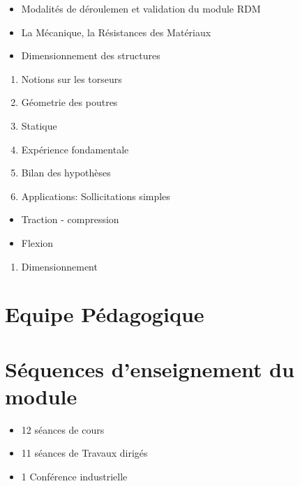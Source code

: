 \documentclass[
]{book}
\providecommand{\tightlist}{%
  \setlength{\itemsep}{0pt}\setlength{\parskip}{0pt}}
\begin{document}
\begin{itemize}
\tightlist
\item
  Modalités de déroulemen et validation du module RDM
\item
  La Mécanique, la Résistances des Matériaux
\item
  Dimensionnement des structures
\end{itemize}

\begin{enumerate}
\def\labelenumi{\arabic{enumi}.}
\tightlist
\item
  Notions sur les torseurs
\item
  Géometrie des poutres
\item
  Statique
\item
  Expérience fondamentale
\item
  Bilan des hypothèses
\item
  Applications: Sollicitations simples
\end{enumerate}

\begin{itemize}
\tightlist
\item
  Traction - compression
\item
  Flexion
\end{itemize}

\begin{enumerate}
\def\labelenumi{\arabic{enumi}.}
\tightlist
\item
  Dimensionnement
\end{enumerate}

\hypertarget{equipe-puxe9dagogique}{%
\section*{Equipe Pédagogique}\label{equipe-puxe9dagogique}}

\hypertarget{suxe9quences-denseignement-du-module}{%
\section*{Séquences d'enseignement du module}\label{suxe9quences-denseignement-du-module}}

\begin{itemize}
\tightlist
\item
  12 séances de cours
\item
  11 séances de Travaux dirigés
\item
  1 Conférence industrielle
\end{itemize}
\end{document}
